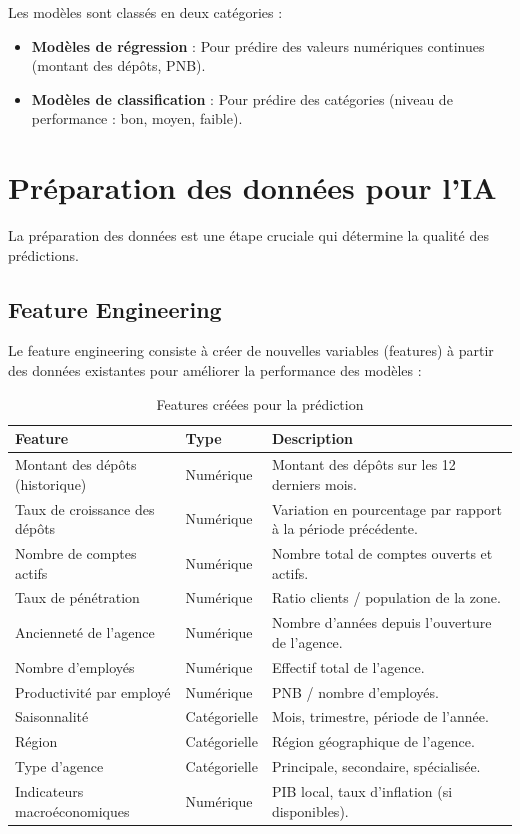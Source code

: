 Les modèles sont classés en deux catégories :

\begin{itemize}
    \item \textbf{Modèles de régression} : Pour prédire des valeurs numériques continues (montant des dépôts, PNB).
    \item \textbf{Modèles de classification} : Pour prédire des catégories (niveau de performance : bon, moyen, faible).
\end{itemize}

\section{Préparation des données pour l'IA}
\label{sec:sprint5-data-preparation}

La préparation des données est une étape cruciale qui détermine la qualité des prédictions.

\subsection{Feature Engineering}

Le feature engineering consiste à créer de nouvelles variables (features) à partir des données existantes pour améliorer la performance des modèles :

\begin{table}[H]
\centering
\begin{tabular}{|p{3.5cm}|p{3.5cm}|p{7cm}|}
\hline
\textbf{Feature} & \textbf{Type} & \textbf{Description} \\
\hline
Montant des dépôts (historique) & Numérique & Montant des dépôts sur les 12 derniers mois. \\
\hline
Taux de croissance des dépôts & Numérique & Variation en pourcentage par rapport à la période précédente. \\
\hline
Nombre de comptes actifs & Numérique & Nombre total de comptes ouverts et actifs. \\
\hline
Taux de pénétration & Numérique & Ratio clients / population de la zone. \\
\hline
Ancienneté de l'agence & Numérique & Nombre d'années depuis l'ouverture de l'agence. \\
\hline
Nombre d'employés & Numérique & Effectif total de l'agence. \\
\hline
Productivité par employé & Numérique & PNB / nombre d'employés. \\
\hline
Saisonnalité & Catégorielle & Mois, trimestre, période de l'année. \\
\hline
Région & Catégorielle & Région géographique de l'agence. \\
\hline
Type d'agence & Catégorielle & Principale, secondaire, spécialisée. \\
\hline
Indicateurs macroéconomiques & Numérique & PIB local, taux d'inflation (si disponibles). \\
\hline
\end{tabular}
\caption{Features créées pour la prédiction}
\label{tab:features}
\end{table}

